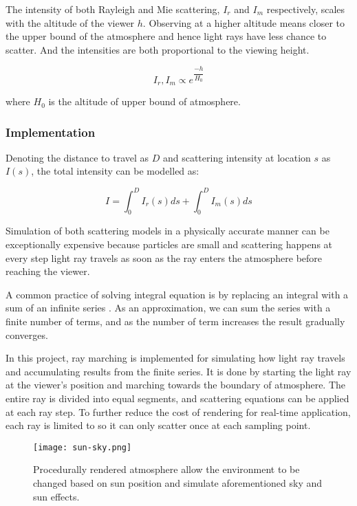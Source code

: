 \documentclass[oneside, a4paper]{report}
\begin{document}
    The intensity of both Rayleigh and Mie scattering, \(I_{r}\) and \(I_{m}\) respectively, scales with the altitude of the viewer \(h\). Observing at a higher altitude means closer to the upper bound of the atmosphere and hence light rays have less chance to scatter. And the intensities are both proportional to the viewing height.

    \begin{equation}
        I_{r}, I_{m} \propto e^{\dfrac{-h}{H_{0}}}
    \end{equation}

    where \(H_{0}\) is the altitude of upper bound of atmosphere.

    \subsubsection{Implementation}

    Denoting the distance to travel as \(D\) and scattering intensity at location \(s\) as \(I(s)\), the total intensity can be modelled as:

    \begin{equation}
        I = \int_{0}^{D} I_{r}(s) ds + \int_{0}^{D} I_{m}(s) ds
    \end{equation}

    Simulation of both scattering models in a physically accurate manner can be exceptionally expensive because particles are small and scattering happens at every step light ray travels as soon as the ray enters the atmosphere before reaching the viewer.

    A common practice of solving integral equation is by replacing an integral with a sum of an infinite series \cite{rendering_equation}. As an approximation, we can sum the series with a finite number of terms, and as the number of term increases the result gradually converges. 
    
    In this project, ray marching is implemented for simulating how light ray travels and accumulating results from the finite series. It is done by starting the light ray at the viewer's position and marching towards the boundary of atmosphere. The entire ray is divided into equal segments, and scattering equations can be applied at each ray step. To further reduce the cost of rendering for real-time application, each ray is limited to so it can only scatter once at each sampling point.

    \begin{figure}[H]
        \texttt{[image: sun-sky.png]}
        \caption{Procedurally rendered atmosphere allow the environment to be changed based on sun position and simulate aforementioned sky and sun effects.}
        \label{sun_sky}
    \end{figure}
\end{document}
